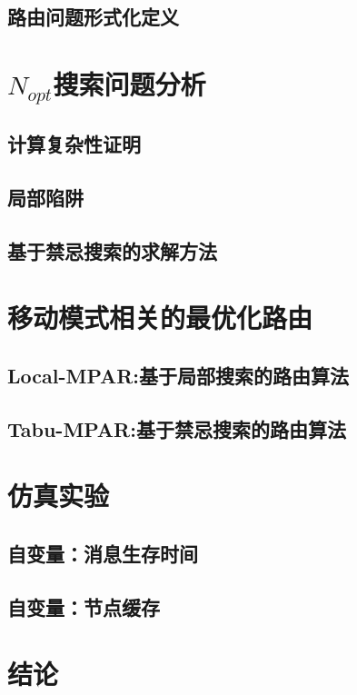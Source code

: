 \subsection{路由问题形式化定义}

\section{$N_{opt}$搜索问题分析}

\subsection{计算复杂性证明}

\subsection{局部陷阱}

\subsection{基于禁忌搜索的求解方法}

\section{移动模式相关的最优化路由}

\subsection{Local-MPAR:基于局部搜索的路由算法}

\subsection{Tabu-MPAR:基于禁忌搜索的路由算法}

\section{仿真实验}

\subsection{自变量：消息生存时间}

\subsection{自变量：节点缓存}

\section{结论}






